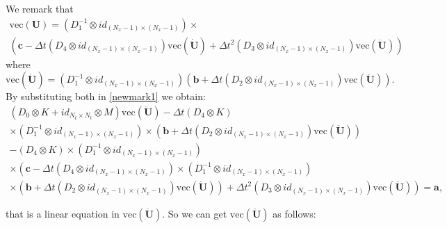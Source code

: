 \documentclass{ws-m3as}
\begin{document}
We remark that
\begin{align*}
\mathrm{vec}(\mathbf{U}) =\left( D_1^{-1} \otimes  id_{(N_x-1)\times(N_x-1)}\right) \times \\
\left( \mathbf{c} - 
\Delta t
\left(D_4 \otimes  id_{(N_x-1)\times(N_x-1)} \right)\mathrm{vec}(\dot{\mathbf{U}}) + \Delta t^2 \left( D_3 \otimes  id_{(N_x-1)\times(N_x-1)} \right) \mathrm{vec}(\ddot{\mathbf{U}})
\right) 
\end{align*}
where
$$
\mathrm{vec}(\dot{\mathbf{U}}) = \left( D_1^{-1} \otimes  id_{(N_x-1)\times(N_x-1)}\right)\left( \mathbf{b} +  \Delta t \left( D_2 \otimes  id_{(N_x-1)\times(N_x-1)}\right) \mathrm{vec}(\ddot{\mathbf{U}})\right).
$$
By substituting both in \eqref{newmark1} we obtain:
$$
\begin{array}{c}
\left(D_0 \otimes K + id_{N_t \times N_t} \otimes  M  \right) \mathrm{vec}(\ddot{\mathbf{U}}) - \Delta t \left(D_4 \otimes  K \right) \\
\times \left( D_1^{-1} \otimes  id_{(N_x-1)\times(N_x-1)}\right) \times \left( \mathbf{b} +  \Delta t \left( D_2 \otimes  id_{(N_x-1)\times(N_x-1)}\right) \mathrm{vec}(\ddot{\mathbf{U}})\right) \\ 
 -  \left( D_4 \otimes   K\right) \times \left( D_1^{-1} \otimes  id_{(N_x-1)\times(N_x-1)}\right) \\ 
\times \left( \mathbf{c} - \Delta t \left(D_4 \otimes  id_{(N_x-1)\times(N_x-1)} \right) \times \left( D_1^{-1} \otimes  id_{(N_x-1)\times(N_x-1)}\right) \right. \\
\left. \times \left( \mathbf{b} +  \Delta t \left( D_2 \otimes  id_{(N_x-1)\times(N_x-1)}\right) \mathrm{vec}(\ddot{\mathbf{U}})\right) + \Delta t^2 \left( D_3 \otimes  id_{(N_x-1)\times(N_x-1)} \right) \mathrm{vec}(\ddot{\mathbf{U}}) \right)   =
\mathbf{a},
\end{array}
$$

that is a linear equation in $\mathrm{vec}(\ddot{\mathbf{U}}).$ So we can get $\mathrm{vec}(\ddot{\mathbf{U}})$ as follows:
\end{document}
